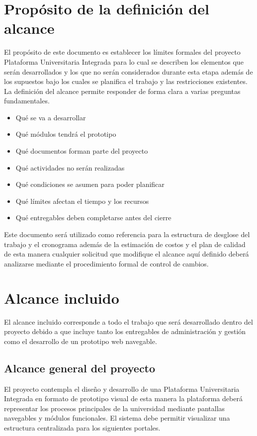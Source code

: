 \documentclass[11pt,spanish]{article}
\begin{document}
\section{Propósito de la definición del alcance}

El propósito de este documento es establecer los límites formales del proyecto Plataforma Universitaria Integrada para lo cual se describen los elementos que serán desarrollados y los que no serán considerados durante esta etapa además de los supuestos bajo los cuales se planifica el trabajo y las restricciones existentes. La definición del alcance permite responder de forma clara a varias preguntas fundamentales.

\begin{itemize}[leftmargin=*]
    \item Qué se va a desarrollar
    \item Qué módulos tendrá el prototipo
    \item Qué documentos forman parte del proyecto
    \item Qué actividades no serán realizadas
    \item Qué condiciones se asumen para poder planificar
    \item Qué límites afectan el tiempo y los recursos
    \item Qué entregables deben completarse antes del cierre
\end{itemize}

Este documento será utilizado como referencia para la estructura de desglose del trabajo y el cronograma además de la estimación de costos y el plan de calidad de esta manera cualquier solicitud que modifique el alcance aquí definido deberá analizarse mediante el procedimiento formal de control de cambios.

\section{Alcance incluido}

El alcance incluido corresponde a todo el trabajo que será desarrollado dentro del proyecto debido a que incluye tanto los entregables de administración y gestión como el desarrollo de un prototipo web navegable.

\subsection{Alcance general del proyecto}

El proyecto contempla el diseño y desarrollo de una Plataforma Universitaria Integrada en formato de prototipo visual de esta manera la plataforma deberá representar los procesos principales de la universidad mediante pantallas navegables y módulos funcionales. El sistema debe permitir visualizar una estructura centralizada para los siguientes portales.
\end{document}
